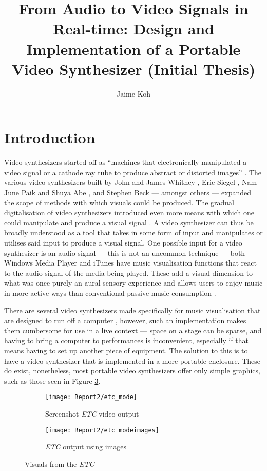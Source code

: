 \documentclass{report}
\title{From Audio to Video Signals in Real-time: Design and Implementation of a Portable Video Synthesizer (Initial Thesis)}
\author{Jaime Koh}
\begin{document}
\newpage
\maketitle
\tableofcontents
\newpage

\section*{Introduction}
\markright{}
Video synthesizers started off as ``machines that electronically manipulated a video signal or a cathode ray tube to produce abstract or distorted images'' \cite{Collopy2014}. The various video synthesizers built by John and James Whitney \cite{Patterson2009}, Eric Siegel \cite{ElectronicArtsIntermix}, Nam June Paik and Shuya Abe \cite{Furlong1983}, and Stephen Beck \cite{Beck1992} --- amongst others --- expanded the scope of methods with which visuals could be produced. The gradual digitalisation of video synthesizers introduced even more means with which one could manipulate and produce a visual signal \cite{Collopy2014}. A video synthesizer can thus be broadly understood as a tool that takes in some form of input and manipulates or utilises said input to produce a visual signal. One possible input for a video synthesizer is an audio signal --- this is not an uncommon technique --- both Windows Media Player and iTunes have music visualisation functions that react to the audio signal of the media being played. These add a visual dimension to what was once purely an aural sensory experience and allows users to enjoy music in more active ways than conventional passive music consumption \cite{Casey2008}. \par

There are several video synthesizers made specifically for music visualisation that are designed to run off a computer \cite{Casey2008}, however, such an implementation makes them cumbersome for use in a live context --- space on a stage can be sparse, and having to bring a computer to performances is inconvenient, especially if that means having to set up another piece of equipment. The solution to this is to have a video synthesizer that is implemented in a more portable enclosure. These do exist, nonetheless, most portable video synthesizers offer only simple graphics, such as those seen in Figure \ref{fig:etc}.

\begin{figure}[b]
  \begin{subfigure}{0.5\textwidth}
    \centering
    \texttt{[image: Report2/etc\_mode]}
    \caption{Screenshot \textit{ETC} video output}
    \label{fig:etc_mode}
  \end{subfigure}
  \begin{subfigure}{0.5\textwidth}
    \centering
    \texttt{[image: Report2/etc\_modeimages]}
    \caption{\textit{ETC} output using images}
    \label{fig:etc_modeimages}
  \end{subfigure}
  \caption{Visuals from the \textit{ETC}}
  \label{fig:etc}
\end{figure}
\end{document}
